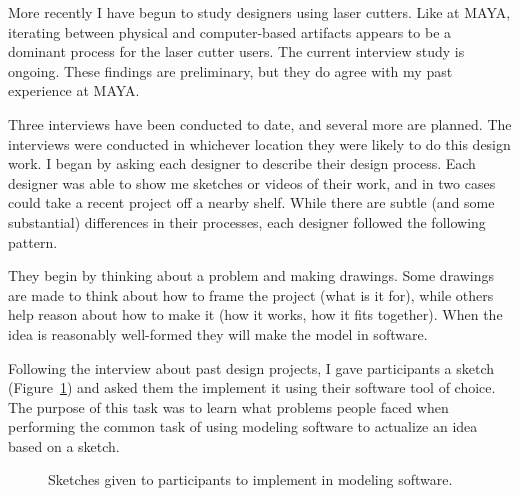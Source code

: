 \documentclass[12pt]{article}
\begin{document}
More recently I have begun to study designers using laser
cutters. Like at MAYA, iterating between physical and computer-based
artifacts appears to be a dominant process for the laser cutter
users. The current interview study is ongoing. These findings are
preliminary, but they do agree with my past experience at MAYA.

Three interviews have been conducted to date, and several more are
planned. The interviews were conducted in whichever location they were
likely to do this design work. I began by asking each designer to
describe their design process. Each designer was able to show me
sketches or videos of their work, and in two cases could take a recent
project off a nearby shelf. While there are subtle (and some
substantial) differences in their processes, each designer followed
the following pattern.

They begin by thinking about a problem and making drawings. Some
drawings are made to think about how to frame the project (what is it
for), while others help reason about how to make it (how it works, how
it fits together). When the idea is reasonably well-formed they will
make the model in software. 

Following the interview about past design projects, I gave
participants a sketch (Figure~\ref{fig:interview-sketch}) and asked
them the implement it using their software tool of choice. The purpose
of this task was to learn what problems people faced when performing
the common task of using modeling software to actualize an idea based
on a sketch.

\begin{figure}
\centering 
{}
\hspace{1cm} 
\caption{Sketches given to participants to implement in modeling software.}
\label{fig:interview-sketch}
\end{figure}
\end{document}
